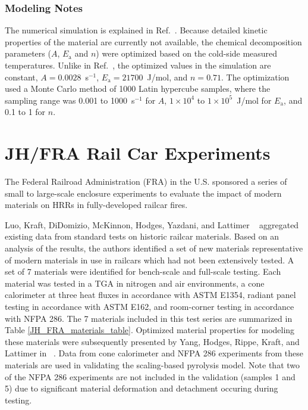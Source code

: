 \subsubsection{Modeling Notes}

The numerical simulation is explained in Ref.~\cite{Paudel:2021}. Because detailed kinetic properties of the material are currently not available, the chemical decomposition parameters ($A$, $E_{\textrm{a}}$ and $n$) were optimized based on the cold-side measured temperatures. Unlike in Ref.~\cite{Paudel:2021}, the optimized values in the simulation are constant, $A=0.0028$~s$^{-1}$, $E_{\textrm{a}}=21700$~J/mol, and $n=0.71$. The optimization used a Monte Carlo method of 1000 Latin hypercube samples, where the sampling range was 0.001 to 1000~s$^{-1}$ for $A$, $1\times10^4$ to $1\times10^5$~J/mol for $E_{\textrm{a}}$, and 0.1 to 1 for $n$.




\section{JH/FRA Rail Car Experiments}
\label{JH_FRA_Description}

The Federal Railroad Administration (FRA) in the U.S. sponsored a series of small to large-scale enclosure experiments to evaluate the impact of modern materials on HRRs in fully-developed railcar fires.

Luo, Kraft, DiDomizio, McKinnon, Hodges, Yazdani, and Lattimer ~\cite{Luo:FRA2019} aggregated existing data from standard tests on historic railcar materials.
Based on an analysis of the results, the authors identified a set of new materials representative of modern materials in use in railcars which had not been extensively tested.
A set of 7 materials were identified for bench-scale and full-scale testing.
Each material was tested in a TGA  in nitrogen and air environments, a cone calorimeter at three heat fluxes in accordance with ASTM E1354, radiant panel testing in accordance with ASTM E162, and room-corner testing in accordance with NFPA 286.
The 7 materials included in this test series are summarized in Table \ref{JH_FRA_materials_table}.
Optimized material properties for modeling these materials were subsequently presented by Yang, Hodges, Rippe, Kraft, and Lattimer in ~\cite{Yang:FRA20}.
Data from cone calorimeter and NFPA 286 experiments from these materials are used in validating the scaling-based pyrolysis model. Note that two of the NFPA 286 experiments are not included in the validation (samples 1 and 5) due to significant material deformation and detachment occuring during testing.

